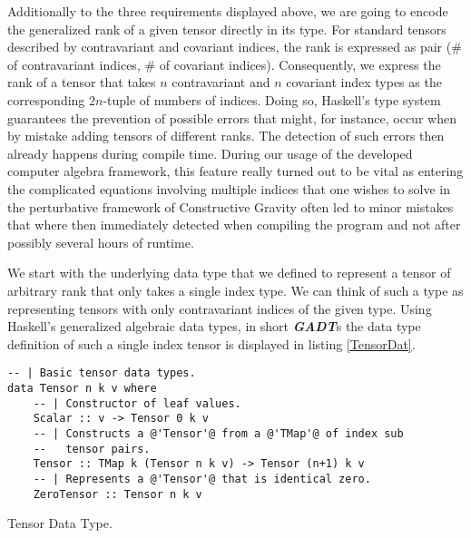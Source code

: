 Additionally to the three requirements displayed above, we are going to encode the generalized rank of a given tensor directly in its type. For standard tensors described by contravariant and covariant indices, the rank is expressed as pair ($\#$ of contravariant indices, $\#$ of covariant indices). Consequently, we express the rank of a tensor that takes $n$ contravariant and $n$ covariant index types as the corresponding $2n$-tuple of numbers of indices. Doing so, Haskell's type system guarantees the prevention of possible errors that might, for instance, occur when by mistake adding tensors of different ranks. The detection of such errors then already happens during compile time. During our usage of the developed computer algebra framework, this feature really turned out to be vital as entering the complicated equations involving multiple indices that one wishes to solve in the perturbative framework of Constructive Gravity often led to minor mistakes that where then immediately detected when compiling the program and not after possibly several hours of runtime.

We start with the underlying data type that we defined to represent a tensor of arbitrary rank that only takes a single index type. We can think of such a type as representing tensors with only contravariant indices of the given type. Using Haskell's generalized algebraic data types, in short \textit{\textbf{GADT}}s the data type definition of such a single index tensor is displayed in listing \ref{TensorDat}. 

\begin{listing}[hbt!]
\begin{verbatim}
-- | Basic tensor data types.
data Tensor n k v where
    -- | Constructor of leaf values.
    Scalar :: v -> Tensor 0 k v
    -- | Constructs a @'Tensor'@ from a @'TMap'@ of index sub
    --   tensor pairs.
    Tensor :: TMap k (Tensor n k v) -> Tensor (n+1) k v
    -- | Represents a @'Tensor'@ that is identical zero.
    ZeroTensor :: Tensor n k v
\end{verbatim} 
\caption{Tensor Data Type.}\label{TensorDat}
\end{listing}

